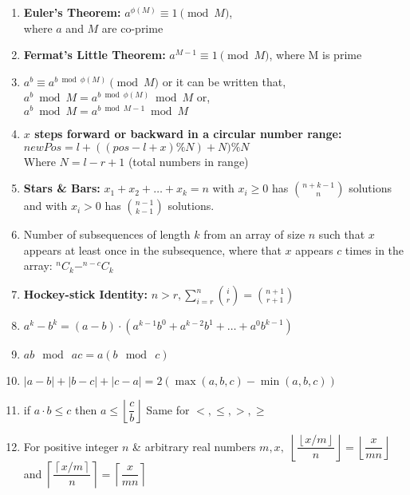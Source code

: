 \documentclass[10pt,a4paper,landscape]{article}
\begin{document}
\begin{multicols*}{3}
\begin{enumerate}
			\item \textbf{Euler's Theorem:} $a^{\phi{(M)}} \equiv 1 \pmod{M}$, \\where $a$ and $M$ are co-prime
			
			\item \textbf{Fermat's Little Theorem:} $a^{M-1} \equiv 1 \pmod{M}$, where M is prime
			
			\item $a^{b} \equiv a^{b\bmod{\phi(M)}} \pmod{M}$ or it can be written that, $a^{b}\bmod{M} = a^{b\bmod{\phi(M)}}\bmod{M}$ or,\\ $a^{b}\bmod{M} = a^{b\bmod{M-1}}\bmod{M}$
			
			\item \textbf{$x$ steps forward or backward in a circular number range:} \\ $newPos = l + ((pos-l+x)\%N)+N)\%N$\\ Where $N = l-r+1$ (total numbers in range)
			
			\item \textbf{Stars \& Bars:} $x_1 + x_2 + \dots + x_k = n$ with $x_i \ge 0$ has $\binom{n + k - 1}{n}$ solutions and with $x_i > 0$ has $\binom{n - 1}{k - 1}$ solutions.
			
			\item Number of subsequences of length $k$ from an array of size $n$ such that $x$ appears at least once in the subsequence, where that $x$ appears $c$ times in the array: $^nC_k - ^{n-c}C_k$ 
			
			\item \textbf{Hockey-stick Identity: } $n > r, \sum \limits_{i=r}^n{i \choose r}={n+1 \choose r+1}$
			
			\item $a^k - b^k = (a - b) \cdot (a^{k - 1}b^0 + a^{k - 2}b^1 + … + a^0b^{k - 1})$
			
			\item $ab \mod\ ac=a(b \mod\ c)$
			
			\item $|a - b| + |b - c| + |c - a| = 2 (\max (a, b, c) - \min (a, b, c))$
			
			\item if $a \cdot b \leq c$ then $a \leq \left \lfloor \dfrac{c}{b} \right \rfloor$ Same for $<, \leq, >, \geq$
			
			\item For positive integer $n$ \& arbitrary real numbers $m, x,$ \newline $\left \lfloor \dfrac{\left \lfloor x/m \right \rfloor}{n} \right \rfloor = \left \lfloor \dfrac{x}{mn} \right \rfloor$ and $\left \lceil \dfrac{\left \lceil x/m \right \rceil}{n} \right \rceil = \left \lceil \dfrac{x}{mn} \right \rceil$
			

\end{enumerate}
\end{multicols*}
\end{document}
